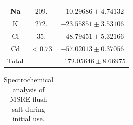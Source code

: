 \documentclass[11pt]{article}
\begin{document}
\begin{table}[ht]
\begin{tabular}{| c | c | c |}
    Na                & $ 209.$                &  $-10.29686\pm4.74132$ \\ \hline
    K                 & $ 272.$                &  $-23.55851\pm3.53106$ \\ \hline
    Cl                &   $35.$                &  $-48.79451\pm5.32166$ \\ \hline
    Cd                & $<  0.73$              &  $-57.02013\pm0.37056$ \\ \hline
    Total             & $-$                    & $-172.05646\pm8.66975$ \\ \hline
    \end{tabular}
\end{table}

\clearpage
\begin{table}[ht]\footnotesize
    \centering
    \caption{Spectrochemical analysis of MSRE flush salt during initial use.}
    \label{tab:detection}
    \begin{tabular}{| c |}
    \end{tabular}
\end{table}
\end{document}

